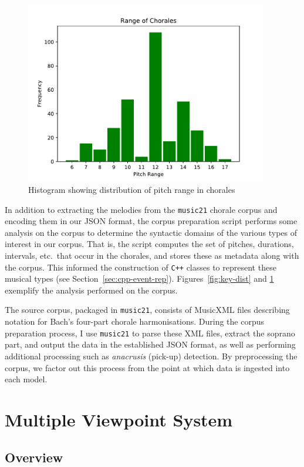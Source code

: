 \documentclass[12pt,a4paper,twoside,openright]{report}
\begin{document}
\begin{figure}[H]
\centering
\includegraphics[width=300pt]{figs/range_dist.pdf}
\caption{Histogram showing distribution of pitch range in chorales}
\label{fig:range-dist}
\end{figure}

In addition to extracting the melodies from the \texttt{music21} chorale corpus
and encoding them in our JSON format, the corpus preparation script performs
some analysis on the corpus to determine the syntactic domains of the various
types of interest in our corpus. That is, the script computes the set of
pitches, durations, intervals, etc.\ that occur in the chorales, and stores
these as metadata along with the corpus. This informed the construction of
\texttt{C++} classes to represent these musical types (see
Section~\ref{sec:cpp-event-rep}). Figures~\ref{fig:key-dist} and
\ref{fig:range-dist} exemplify the analysis performed on the corpus.

The source corpus, packaged in \texttt{music21}, consists of MusicXML files
describing notation for Bach's four-part chorale harmonisations. During the
corpus preparation process, I use \texttt{music21} to parse these XML files,
extract the soprano part, and output the data in the established JSON format, as
well as performing additional processing such as \emph{anacrusis} (pick-up)
detection. By preprocessing the corpus, we factor out this process from the
point at which data is ingested into each model.

\section{Multiple Viewpoint System}

\subsection{Overview}
\end{document}
